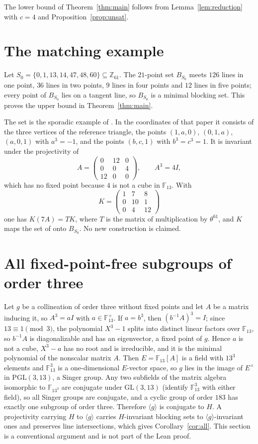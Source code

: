 \documentclass[11pt]{article}
\theoremstyle{remark}
\newcommand{\F}{\mathbb{F}}
\newcommand{\Z}{\mathbb{Z}}
\begin{document}
The lower bound of Theorem~\ref{thm:main} follows from Lemma~\ref{lem:reduction}
with $c=4$ and Proposition~\ref{prop:unsat}.

\section{The matching example}\label{sec:witness}

Let $S_0=\{0,1,13,14,47,48,60\}\subseteq\Z_{61}$. The $21$-point set
$B_{S_0}$ meets $126$ lines in one point, $36$ lines in two points, $9$ lines
in four points and $12$ lines in five points; every point of $B_{S_0}$ lies on
a tangent line, so $B_{S_0}$ is a minimal blocking set. This proves the upper
bound in Theorem~\ref{thm:main}.

The set is the sporadic example of \cite[Section~5.3]{BBW}. In the
coordinates of that paper it consists of the three vertices of the reference
triangle, the points $(1,a,0)$, $(0,1,a)$, $(a,0,1)$ with $a^3=-1$, and the
points $(b,c,1)$ with $b^3=c^3=1$. It is invariant under the projectivity of
\[
  A=\begin{pmatrix}0&12&0\\0&0&4\\12&0&0\end{pmatrix},\qquad A^3=4I,
\]
which has no fixed point because $4$ is not a cube in $\F_{13}$. With
\[
  K=\begin{pmatrix}1&7&8\\0&10&1\\0&4&12\end{pmatrix}
\]
one has $K(7A)=TK$, where $T$ is the matrix of multiplication by
$\theta^{61}$, and $K$ maps the set of \cite{BBW} onto $B_{S_0}$. No new
construction is claimed.

\section{All fixed-point-free subgroups of order three}\label{sec:conj}

Let $g$ be a collineation of order three without fixed points and let $A$ be
a matrix inducing it, so $A^3=aI$ with $a\in\F_{13}^\times$. If $a=b^3$, then
$(b^{-1}A)^3=I$; since $13\equiv1\pmod3$, the polynomial $X^3-1$ splits into
distinct linear factors over $\F_{13}$, so $b^{-1}A$ is diagonalizable and
has an eigenvector, a fixed point of $g$. Hence $a$ is not a cube, $X^3-a$ has
no root and is irreducible, and it is the minimal polynomial of the
nonscalar matrix $A$. Then $E=\F_{13}[A]$ is a field with $13^3$ elements and
$\F_{13}^3$ is a one-dimensional $E$-vector space, so $g$ lies in the image of
$E^\times$ in $\mathrm{PGL}(3,13)$, a Singer group. Any two subfields of the
matrix algebra isomorphic to $\F_{13^3}$ are conjugate under $\mathrm{GL}(3,13)$
(identify $\F_{13}^3$ with either field), so all Singer groups are conjugate,
and a cyclic group of order $183$ has exactly one subgroup of order three.
Therefore $\langle g\rangle$ is conjugate to $H$. A projectivity carrying $H$
to $\langle g\rangle$ carries $H$-invariant blocking sets to
$\langle g\rangle$-invariant ones and preserves line intersections, which
gives Corollary~\ref{cor:all}. This section is a conventional argument and is
not part of the Lean proof.
\end{document}
